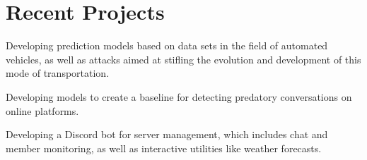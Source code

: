 \documentclass[]{deedy-resume-openfont}
\begin{document}
\sectionsep
\section{Recent Projects}
\begin{tightemize}
\large{
\item Developing prediction models based on data sets in the field of automated vehicles, as well as attacks aimed at stifling the evolution and development of this mode of transportation.
\item Developing models to create a baseline for detecting predatory conversations on online platforms.
}
\end{tightemize}
\sectionsep

\begin{tightemize}
\large{
\item Developing a Discord bot for server management, which includes chat and member monitoring, as well as interactive utilities like weather forecasts.
}

\end{tightemize}
\sectionsep





\sectionsep\sectionsep\sectionsep\sectionsep\sectionsep\sectionsep
\end{document}
